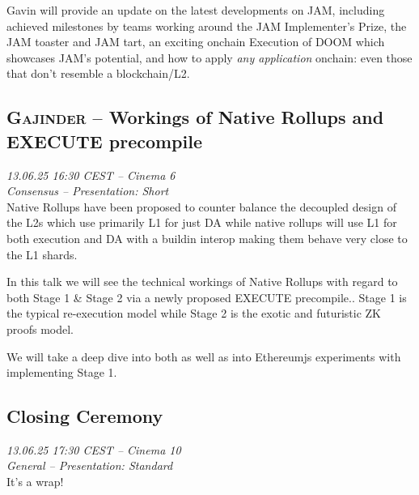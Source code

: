 Gavin will provide an update on the latest developments on JAM, including achieved milestones by teams working around the JAM Implementer’s Prize, the JAM toaster and JAM tart, an exciting onchain Execution of DOOM which showcases JAM’s potential, and how to apply \emph{any application} onchain: even those that don't resemble a blockchain/L2.

\clearpage
\subsection {\textsc{Gajinder}  -- Workings of Native Rollups and EXECUTE precompile} \noindent \textit {13.06.25 16:30 CEST -- Cinema 6\\ Consensus -- Presentation: Short}\\[1em] Native Rollups have been proposed to counter balance the decoupled design of the L2s which use primarily L1 for just DA while native rollups will use L1 for both execution and DA with a buildin  interop  making them behave very close to the L1 shards.

In this talk we will see the technical workings of Native Rollups with regard to both Stage 1 \& Stage 2 via a newly proposed EXECUTE precompile..  Stage 1 is the typical re-execution model while Stage 2 is the exotic and futuristic ZK proofs model.

We will take a deep dive into both as well as into Ethereumjs experiments with implementing Stage 1.

\clearpage
\subsection {Closing Ceremony} \noindent \textit {13.06.25 17:30 CEST -- Cinema 10\\ General -- Presentation: Standard}\\[1em] It's a wrap!

\clearpage
\cleardoublepage


